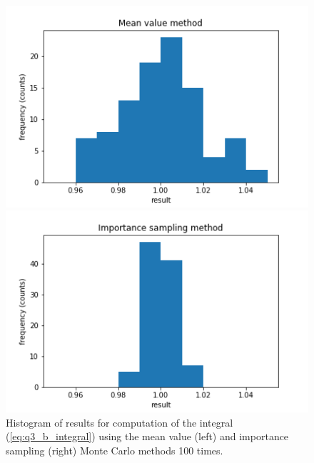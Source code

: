 \documentclass{article}
\begin{document}
\begin{figure}[H]
	\centering
	\begin{minipage}{0.49\linewidth}
		\includegraphics[width=\linewidth]{../images/q3_b_mv.png}
	\end{minipage}
	\begin{minipage}{0.49\linewidth}
		\includegraphics[width=\linewidth]{../images/q3_b_is.png}
	\end{minipage}
	\caption{Histogram of results for computation of the integral (\ref{eq:q3_b_integral}) using the mean value (left) and importance sampling (right) Monte Carlo methods 100 times.}
	\label{fig:q3_b}
\end{figure}
\end{document}
